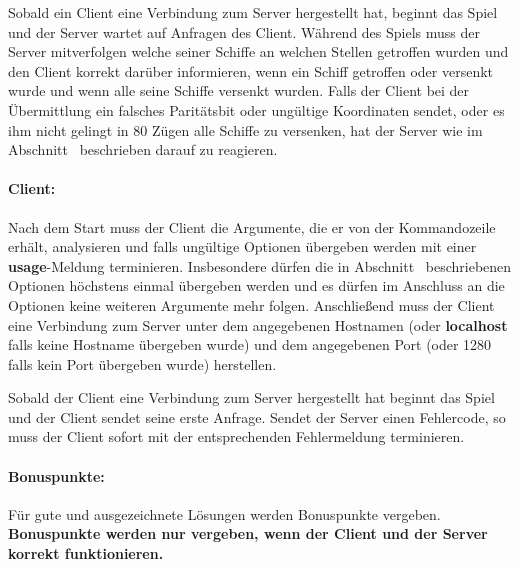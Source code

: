Sobald ein Client eine Verbindung zum Server hergestellt hat, beginnt das Spiel und der Server wartet auf Anfragen des Client.
Während des Spiels muss der Server mitverfolgen welche seiner Schiffe an welchen Stellen getroffen wurden
und den Client korrekt darüber informieren, wenn ein Schiff getroffen oder versenkt wurde
und wenn alle seine Schiffe versenkt wurden.
Falls der Client bei der Übermittlung ein falsches Paritätsbit oder ungültige Koordinaten sendet,
oder es ihm nicht gelingt in 80 Zügen alle Schiffe zu versenken,
hat der Server wie im Abschnitt~ beschrieben darauf zu reagieren.

\paragraph{Client:}
Nach dem Start muss der Client die Argumente, die er von der Kommandozeile erhält, analysieren
und falls ungültige Optionen übergeben werden mit einer \textbf{usage}-Meldung terminieren.
Insbesondere dürfen die in Abschnitt~ beschriebenen Optionen höchstens einmal
übergeben werden und es dürfen im Anschluss an die Optionen keine weiteren Argumente mehr folgen.
Anschließend muss der Client eine Verbindung zum Server unter dem angegebenen Hostnamen (oder \textbf{localhost}
falls keine Hostname übergeben wurde) und dem angegebenen Port (oder 1280 falls kein Port übergeben wurde)
herstellen.

Sobald der Client eine Verbindung zum Server hergestellt hat beginnt das Spiel
und der Client sendet seine erste Anfrage.
Sendet der Server einen Fehlercode, so muss der Client sofort mit der
entsprechenden Fehlermeldung terminieren.

\paragraph{Bonuspunkte:} Für gute und ausgezeichnete Lösungen werden Bonuspunkte vergeben.
\textbf{Bonuspunkte werden nur vergeben, wenn der Client und der Server korrekt funktionieren.}

